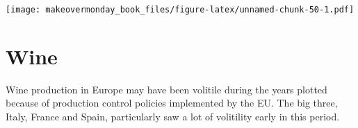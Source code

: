 \documentclass[]{book}
\newenvironment{Shaded}{\begin{snugshade}}{\end{snugshade}}
\newcommand{\KeywordTok}[1]{\textcolor[rgb]{0.13,0.29,0.53}{\textbf{#1}}}
\newcommand{\StringTok}[1]{\textcolor[rgb]{0.31,0.60,0.02}{#1}}
\newcommand{\OperatorTok}[1]{\textcolor[rgb]{0.81,0.36,0.00}{\textbf{#1}}}
\newcommand{\NormalTok}[1]{#1}
\theoremstyle{definition}
\theoremstyle{definition}
\theoremstyle{definition}
\theoremstyle{remark}
\begin{document}
\texttt{[image: makeovermonday\_book\_files/figure-latex/unnamed-chunk-50-1.pdf]}

\chapter{Wine}\label{wine}

Wine production in Europe may have been volitile during the years
plotted because of production control policies implemented by the EU.
The big three, Italy, France and Spain, particularly saw a lot of
volitility early in this period.

\begin{Shaded}
\end{Shaded}
\end{document}
